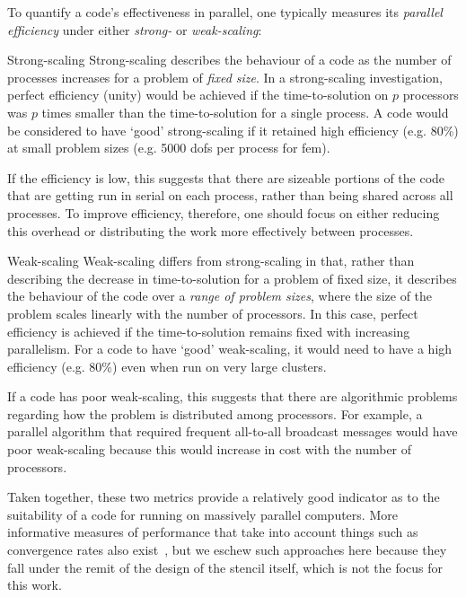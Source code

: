 To quantify a code's effectiveness in parallel, one typically measures its \textit{parallel efficiency} under either \textit{strong-} or \textit{weak-scaling}:

\begin{paragraph}{Strong-scaling}
  Strong-scaling describes the behaviour of a code as the number of processes increases for a problem of \textit{fixed size}.
  In a strong-scaling investigation, perfect efficiency (unity) would be achieved if the time-to-solution on $p$ processors was $p$ times smaller than the time-to-solution for a single process.
  A code would be considered to have `good' strong-scaling if it retained high efficiency (e.g. 80\%) at small problem sizes (e.g. 5000 \glspl{dof} per process for \gls{fem}).

  If the efficiency is low, this suggests that there are sizeable portions of the code that are getting run in serial on each process, rather than being shared across all processes.
  To improve efficiency, therefore, one should focus on either reducing this overhead or distributing the work more effectively between processes.
\end{paragraph}

\begin{paragraph}{Weak-scaling}
  Weak-scaling differs from strong-scaling in that, rather than describing the decrease in time-to-solution for a problem of fixed size, it describes the behaviour of the code over a \textit{range of problem sizes}, where the size of the problem scales linearly with the number of processors.
  In this case, perfect efficiency is achieved if the time-to-solution remains fixed with increasing parallelism.
  For a code to have `good' weak-scaling, it would need to have a high efficiency (e.g. 80\%) even when run on very large clusters.

  If a code has poor weak-scaling, this suggests that there are algorithmic problems regarding how the problem is distributed among processors.
  For example, a parallel algorithm that required frequent all-to-all broadcast messages would have poor weak-scaling because this would increase in cost with the number of processors.
\end{paragraph}

\vspace{1em}

Taken together, these two metrics provide a relatively good indicator as to the suitability of a code for running on massively parallel computers.
More informative measures of performance that take into account things such as convergence rates also exist~\cite{changComparativeStudyFinite2018}, but we eschew such approaches here because they fall under the remit of the design of the stencil itself, which is not the focus for this work.

